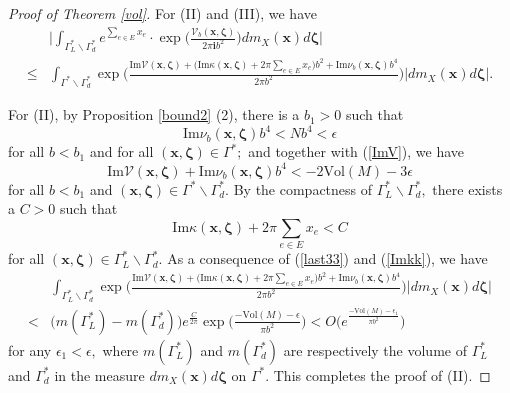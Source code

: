 \documentclass[11pt]{article}
\renewcommand{\setminus}{{\smallsetminus}}
\theoremstyle{remark}
\theoremstyle{remark}
\numberwithin{equation}{section}
\begin{document}
\begin{proof}[Proof of Theorem \ref{vol}]
For (II) and (III), we have
\begin{equation*}
\begin{split}
& \bigg|\int_{\Gamma^*_L\setminus \Gamma^*_d} e^{\sum_{e\in E}x_e}\cdot\exp\bigg(\frac{\mathcal V_b(\boldsymbol x, \boldsymbol \zeta)}{2\pi \mathbf i b^2}\bigg)dm_X(\boldsymbol x)  d \boldsymbol \zeta\bigg|\\
\leqslant & \int_{\Gamma^*\setminus \Gamma^*_d}\exp\bigg(\frac{\mathrm{Im}\mathcal V(\boldsymbol  x,\boldsymbol \zeta)+\big(\mathrm{Im}\kappa(\boldsymbol x,\boldsymbol \zeta)+ 2\pi \sum_{e\in E}x_e\big)b^2+\mathrm{Im}\nu_b(\boldsymbol  x,\boldsymbol \zeta)b^4}{2\pi b^2} \bigg)|dm_X(\boldsymbol x)  d \boldsymbol \zeta|.
\end{split}
\end{equation*}
\smallskip


For  (II), by Proposition \ref{bound2} (2), there is a  $b_1>0$ such that 
\begin{equation}\label{last22}
\mathrm{Im}\nu_b(\boldsymbol x,\boldsymbol \zeta)b^4<Nb^4<\epsilon 
\end{equation}
for all $b<b_1$ and for all $(\boldsymbol x,\boldsymbol \zeta)\in\Gamma^*;$  and together with  (\ref{ImV}), we have
\begin{equation}\label{last33}
\mathrm{Im}\mathcal V(\boldsymbol  x, \boldsymbol \zeta)+\mathrm{Im}  \nu_{b}(\boldsymbol  x,\boldsymbol \zeta)b^4< -2\mathrm{Vol}(M) -3\epsilon
\end{equation}
for all $b<b_1$ and  $(\boldsymbol x,\boldsymbol \zeta)\in\Gamma^*\setminus \Gamma^*_d.$ By the compactness of ${\Gamma^*_L}\setminus \Gamma^*_d,$ there exists a $C>0$ such that 
\begin{equation}\label{Imkk}
\mathrm{Im}\kappa(\boldsymbol x,\boldsymbol \zeta)+2\pi \sum_{e\in E}x_e<C
\end{equation}
for all $(\boldsymbol x,\boldsymbol \zeta)\in\Gamma^*_L\setminus \Gamma^*_d.$ As a consequence of (\ref{last33}) and (\ref{Imkk}), we have
\begin{equation*}
\begin{split}
& \int_{\Gamma^*_L\setminus \Gamma^*_d}\exp\bigg(\frac{\mathrm{Im}\mathcal V(\boldsymbol  x,\boldsymbol \zeta)+\big(\mathrm{Im}\kappa(\boldsymbol x,\boldsymbol \zeta)+ 2\pi \sum_{e\in E}x_e\big)b^2+\mathrm{Im}\nu_b(\boldsymbol  x,\boldsymbol \zeta)b^4}{2\pi b^2} \bigg)|dm_X(\boldsymbol x)  d \boldsymbol \zeta|\\
<  & \Big(m(\Gamma^*_L)-m(\Gamma^*_d)\Big) e^{\frac{C}{2\pi}}\exp\bigg(\frac{-\mathrm{Vol}(M)-\epsilon }{\pi b^2}   \bigg )< O\Big(e^{\frac{-\mathrm{Vol}(M)-\epsilon_1}{\pi b^2}}\Big)
\end{split}
\end{equation*}
for any $\epsilon_1<\epsilon,$ where $m(\Gamma^*_L)$ and $m(\Gamma^*_d)$ are respectively the volume of $\Gamma^*_L$ and $\Gamma^*_d$ in the measure $dm_X(\boldsymbol x)  d \boldsymbol \zeta$ on $\Gamma^*.$ This completes the proof of (II). 
\medskip










\end{proof}
\end{document}
